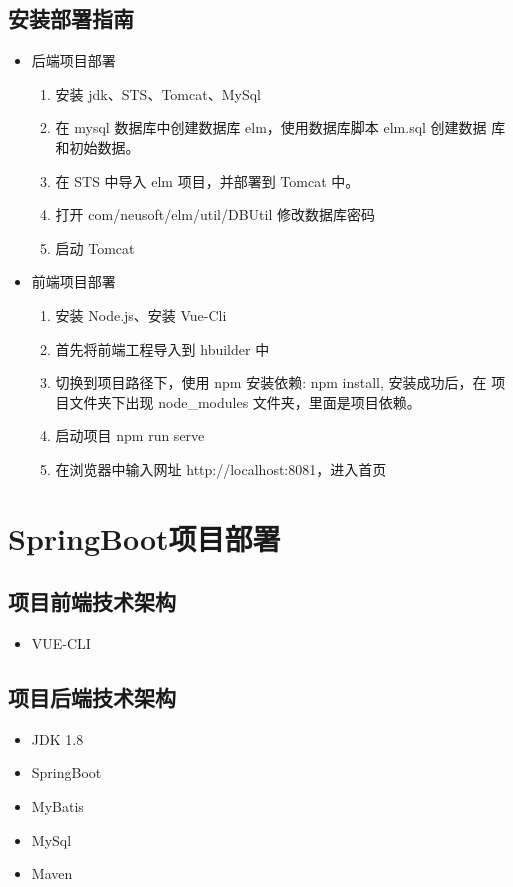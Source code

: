 \subsection {安装部署指南}
\begin{itemize}
    \item {后端项目部署}
        \begin{enumerate}
            \item 安装 jdk、STS、Tomcat、MySql
            \item 在 mysql 数据库中创建数据库 elm，使用数据库脚本 elm.sql 创建数据
            库和初始数据。
            \item 在 STS 中导入 elm 项目，并部署到 Tomcat 中。
            \item 打开 com/neusoft/elm/util/DBUtil 修改数据库密码
            \item 启动 Tomcat
        \end{enumerate}
    \item {前端项目部署}
        \begin{enumerate}
            \item 安装 Node.js、安装 Vue-Cli
            \item 首先将前端工程导入到 hbuilder 中
            \item 切换到项目路径下，使用 npm 安装依赖: npm install, 安装成功后，在
            项目文件夹下出现 node\_modules 文件夹，里面是项目依赖。
            \item 启动项目 npm run serve
            \item 在浏览器中输入网址 http://localhost:8081，进入首页
        \end{enumerate}
\end{itemize}

\section{SpringBoot项目部署}

\subsection{项目前端技术架构}
    \begin{itemize}
        \item VUE-CLI
    \end{itemize}

\subsection{项目后端技术架构}
    \begin{itemize}
        \item JDK 1.8
        \item SpringBoot
        \item MyBatis
        \item MySql
        \item Maven
    \end{itemize}
    

